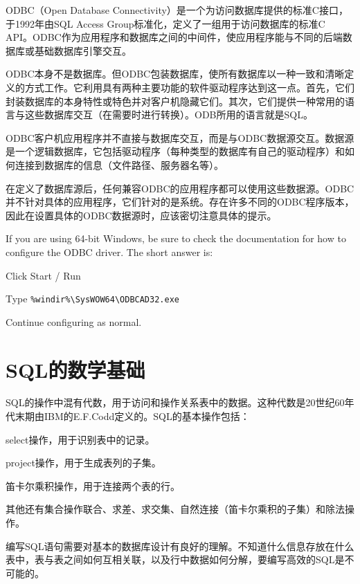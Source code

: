 ODBC（Open Database Connectivity）是一个为访问数据库提供的标准C接口，于1992年由SQL Access Group标准化，定义了一组用于访问数据库的标准C API。ODBC作为应用程序和数据库之间的中间件，使应用程序能与不同的后端数据库或基础数据库引擎交互。

ODBC本身不是数据库。但ODBC包装数据库，使所有数据库以一种一致和清晰定义的方式工作。它利用具有两种主要功能的软件驱动程序达到这一点。首先，它们封装数据库的本身特性或特色并对客户机隐藏它们。其次，它们提供一种常用的语言与这些数据库交互（在需要时进行转换）。ODB所用的语言就是SQL。

ODBC客户机应用程序并不直接与数据库交互，而是与ODBC数据源交互。数据源是一个逻辑数据库，它包括驱动程序（每种类型的数据库有自己的驱动程序）和如何连接到数据库的信息（文件路径、服务器名等）。

在定义了数据库源后，任何兼容ODBC的应用程序都可以使用这些数据源。ODBC并不针对具体的应用程序，它们针对的是系统。存在许多不同的ODBC程序版本，因此在设置具体的ODBC数据源时，应该密切注意具体的提示。

If you are using 64-bit Windows, be sure to check the documentation for how to configure the ODBC driver.  The short answer is:

\begin{compactenum}
\item Click Start / Run
\item Type \texttt{\%windir\%{\textbackslash}SysWOW64{\textbackslash}ODBCAD32.exe}
\item Continue configuring as normal.
\end{compactenum}


\section{SQL的数学基础}


SQL的操作中混有代数，用于访问和操作关系表中的数据。这种代数是20世纪60年代末期由IBM的E.F.Codd定义的。SQL的基本操作包括：

\begin{compactitem}
\item select操作，用于识别表中的记录。
\item project操作，用于生成表列的子集。
\item 笛卡尔乘积操作，用于连接两个表的行。
\end{compactitem}

其他还有集合操作联合、求差、求交集、自然连接（笛卡尔乘积的子集）和除法操作。

编写SQL语句需要对基本的数据库设计有良好的理解。不知道什么信息存放在什么表中，表与表之间如何互相关联，以及行中数据如何分解，要编写高效的SQL是不可能的。


